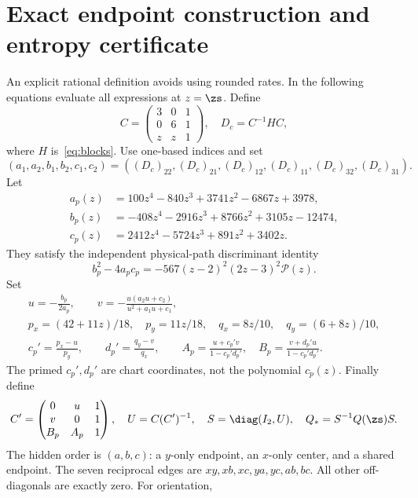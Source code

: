 \section{Exact endpoint construction and entropy certificate}\label{app:certificate}
An explicit rational definition avoids using rounded rates. In the following equations evaluate all expressions at $z=\zs$. Define
\begin{equation}
 C=\begin{pmatrix}3&0&1\\0&6&1\\z&z&1\end{pmatrix},\quad D_c=C^{-1}HC,
\end{equation}
where $H$ is~\eqref{eq:blocks}. Use one-based indices and set
\begin{equation}
 (a_1,a_2,b_1,b_2,c_1,c_2)
 =((D_c)_{22},(D_c)_{21},(D_c)_{12},(D_c)_{11},(D_c)_{32},(D_c)_{31}).
\end{equation}
Let
\begin{align}
 a_p(z)&=100z^4-840z^3+3741z^2-6867z+3978,\\
 b_p(z)&=-408z^4-2916z^3+8766z^2+3105z-12474,\\
 c_p(z)&=2412z^4-5724z^3+891z^2+3402z.
\end{align}
They satisfy the independent physical-path discriminant identity
\begin{equation}
 b_p^2-4a_pc_p=-567(z-2)^2(2z-3)^2\mathcal P(z).\label{eq:pathdisc}
\end{equation}
Set
\begin{gather}
 u=-\frac{b_p}{2a_p},\qquad v=-\frac{u(a_2u+c_2)}{u^2+a_1u+c_1},\\
 p_x=(42+11z)/18,\quad p_y=11z/18,\quad
 q_x=8z/10,\quad q_y=(6+8z)/10,\\
 c_p'=\frac{p_x-u}{p_y},\qquad d_p'=\frac{q_y-v}{q_x},\qquad
 A_p=\frac{u+c_p'v}{1-c_p'd_p'},\quad
 B_p=\frac{v+d_p'u}{1-c_p'd_p'}.\label{eq:pathcoordinates}
\end{gather}
The primed $c_p',d_p'$ are chart coordinates, not the polynomial $c_p(z)$. Finally define
\begin{equation}
 C'=\begin{pmatrix}0&u&1\\v&0&1\\B_p&A_p&1\end{pmatrix},\quad
 U=C(C')^{-1},\quad S=\diag(I_2,U),\quad Q_*=S^{-1}Q(\zs)S.\label{eq:target}
\end{equation}
The hidden order is $(a,b,c)$: a $y$-only endpoint, an $x$-only center, and a shared endpoint. The seven reciprocal edges are $xy,xb,xc,ya,yc,ab,bc$. All other off-diagonals are exactly zero. For orientation,
